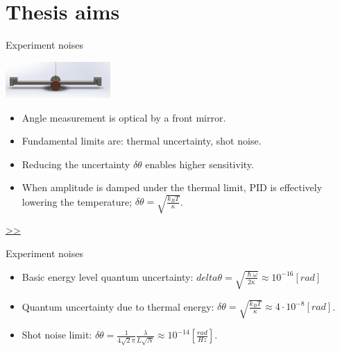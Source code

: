 \documentclass{beamer}
\begin{document}
\section{Thesis aims}
\begin{frame}{Experiment noises}
	\begin{center}		
		\includegraphics[width=0.3\textwidth,keepaspectratio]{pendulum_front.png}
    \end{center}
	\begin{itemize}
		
		\item Angle measurement is optical by a front mirror.
		\item Fundamental limits are: thermal uncertainty, shot noise. 
		\pause
		\item Reducing the uncertainty $\delta\theta$ enables higher sensitivity.
		\item When amplitude is damped under the thermal limit, PID is effectively lowering the temperature; $\delta\theta = \sqrt{\frac{k_B T}{\kappa}}$. 
		
		
	\end{itemize}
	\hyperlink{frame:Gravimetric measurement}{>>} 
\end{frame}
\begin{frame}{Experiment noises}
	\begin{itemize}
		\framesubtitle{Fundamental limits}
		\item Basic energy level quantum uncertainty: $delta\theta= \sqrt{\frac{\hslash\omega}{2\kappa}} \approx 10^{-16} [rad]$
		\item Quantum uncertainty due to thermal energy: $\delta\theta = \sqrt{\frac{k_B T}{\kappa}} \approx 4\cdot 10^{-8} [rad]$.
		\item Shot noise limit: $\delta\theta = \frac{1}{4\sqrt{2}\pi}\frac{\lambda}{L\sqrt{N}} \approx 10^{-14} [\frac{rad}{Hz}]$.
		
	\end{itemize}
\end{frame}
\end{document}
